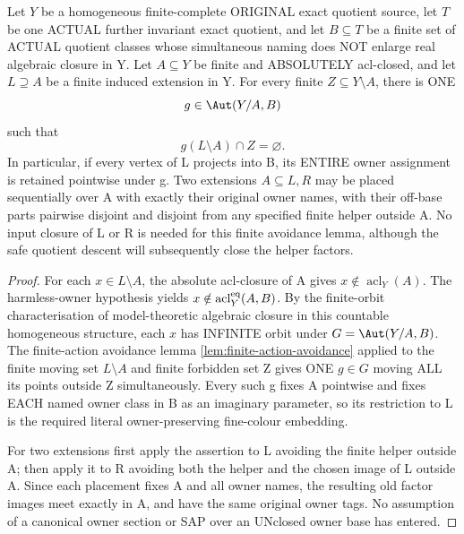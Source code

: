\begin{lemma}
\label{lem:acf-harmless-owner-avoidance}
Let $Y$ be a homogeneous
finite-complete ORIGINAL
exact quotient source, let
$T$ be one ACTUAL further
invariant exact quotient,
and let $B\subseteq T$
be a finite set of ACTUAL
quotient classes whose
simultaneous naming does
NOT enlarge real algebraic
closure in Y.
Let $A\subseteq Y$
be finite and ABSOLUTELY
acl-closed, and let
$L\supseteq A$ be a finite
induced extension in Y.
For every finite
$Z\subseteq Y\setminus A$,
there is ONE
\[
             g\in\Aut(Y/A,B)
\]
such that
\[
                    g(L\setminus A)
                                  \cap Z=\varnothing.
\tag{OAV}\label{eq:acf-harmless-owner-avoidance}
\]
In particular, if every
vertex of L projects into B,
its ENTIRE owner assignment
is retained pointwise
under g. Two extensions
$A\subseteq L,R$ may be
placed sequentially over
A with exactly their
original owner names,
with their off-base parts
pairwise disjoint and
disjoint from any
specified finite helper
outside A. No input
closure of L or R is
needed for this finite
avoidance lemma, although
the safe quotient descent
will subsequently close
the helper factors.
\end{lemma}
\begin{proof}
For each $x\in L\setminus A$,
the absolute acl-closure
of A gives
$x\notin\operatorname{acl}_Y(A)$.
The harmless-owner
hypothesis yields
$x\notin
 \operatorname{acl}^{\rm eq}_Y(A,B)$.
By the finite-orbit
characterisation of
model-theoretic algebraic
closure in this countable
homogeneous structure,
each $x$ has INFINITE
orbit under
$G=\Aut(Y/A,B)$.
The finite-action
avoidance lemma
\cref{lem:finite-action-avoidance}
applied to the finite
moving set $L\setminus A$
and finite forbidden set
Z gives ONE $g\in G$
moving ALL its points
outside Z simultaneously.
Every such g fixes A
pointwise and fixes EACH
named owner class in B
as an imaginary parameter,
so its restriction to
L is the required
literal owner-preserving
fine-colour embedding.

For two extensions first
apply the assertion to L
avoiding the finite
helper outside A;
then apply it to R
avoiding both the helper
and the chosen image of
L outside A. Since each
placement fixes A and
all owner names, the
resulting old factor
images meet exactly
in A, and have the same
original owner tags.
No assumption of a
canonical owner section
or SAP over an UNclosed
owner base has entered.
\end{proof}

